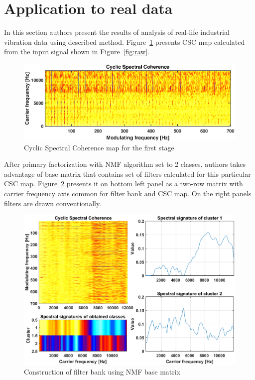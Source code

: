 \documentclass[3p, 12pt]{elsarticle} %
\begin{document}
\section{Application to real data}

In this section authors present the results of analysis of real-life industrial vibration data using described method. Figure~\ref{fig:csc} presents CSC map calculated from the input signal shown in Figure~\ref{fig:raw}. 

\begin{figure}[ht!]
\centering
\includegraphics[width=.7\textwidth]{wykresy/csc}
\caption{Cyclic Spectral Coherence map for the first stage}
\label{fig:csc}
\end{figure}

After primary factorization with NMF algorithm set to 2 classes, authors takes advantage of base matrix that contains set of filters calculated for this particular CSC map. Figure~\ref{fig:trans} presents it on bottom left panel as a two-row matrix with carrier frequency axis common for filter bank and CSC map. On the right panels filters are drawn conventionally. 

\begin{figure}[ht!]
\centering
\includegraphics[width=.8\textwidth]{wykresy/trans}
\caption{Construction of filter bank using NMF base matrix}
\label{fig:trans}
\end{figure}
\end{document}
